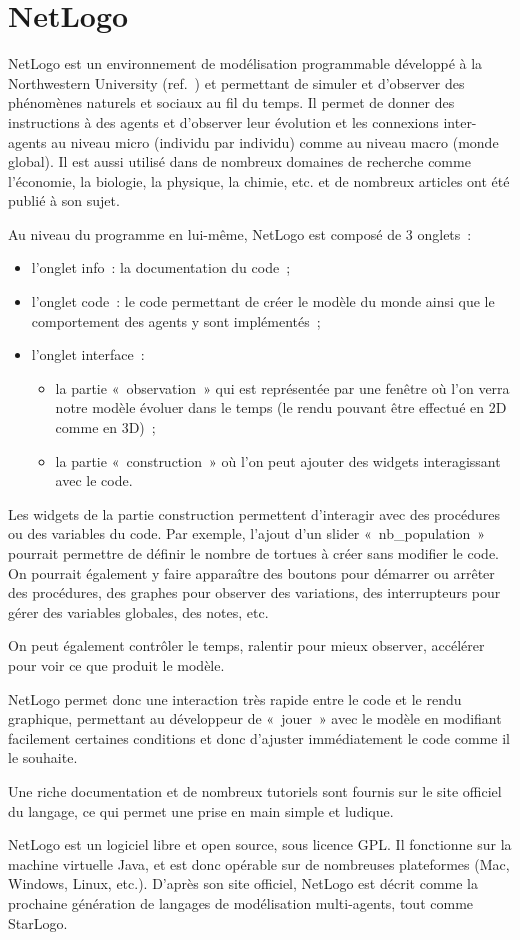\section{NetLogo}
\label{NetLogo}

NetLogo est un environnement de modélisation programmable développé à la Northwestern University (ref.~\cite{netlogo}) et permettant de simuler et d'observer des phénomènes naturels et sociaux au fil du temps. Il permet de donner des instructions à des agents et d'observer leur évolution et les connexions inter-agents au niveau micro (individu par individu) comme au niveau macro (monde global).
Il est aussi utilisé dans de nombreux domaines de recherche comme l'économie, la biologie, la physique, la chimie, etc. et de nombreux articles ont été publié à son sujet.

Au niveau du programme en lui-même, NetLogo est composé de 3 onglets~:
\begin{itemize}
	\item l'onglet info~: la documentation du code~;
	\item l'onglet code~: le code permettant de créer le modèle du monde ainsi que le comportement des agents y sont implémentés~;
	\item l'onglet interface~:
          \begin{itemize}
          \item la partie «~observation~» qui est représentée par une fenêtre où l'on verra notre modèle évoluer dans le temps (le rendu pouvant être effectué en 2D comme en 3D)~;
          \item la partie «~construction~» où l'on peut ajouter des widgets interagissant avec le code.
          \end{itemize}
\end{itemize}

Les widgets de la partie construction permettent d'interagir avec des procédures ou des variables du code. Par exemple, l'ajout d'un slider «~nb\_population~» pourrait permettre de définir le nombre de tortues à créer sans modifier le code. On pourrait également y faire apparaître des boutons pour démarrer ou arrêter des procédures, des graphes pour observer des variations, des interrupteurs pour gérer des variables globales, des notes, etc.

On peut également contrôler le temps, ralentir pour mieux observer, accélérer pour voir ce que produit le modèle.

NetLogo permet donc une interaction très rapide entre le code et le rendu graphique, permettant au développeur de «~jouer~» avec le modèle en modifiant facilement certaines conditions et donc d'ajuster immédiatement le code comme il le souhaite.

Une riche documentation et de nombreux tutoriels sont fournis sur le site officiel du langage, ce qui permet une prise en main simple et ludique.

NetLogo est un logiciel libre et open source, sous licence GPL. Il fonctionne sur la machine virtuelle Java, et est donc opérable sur de nombreuses plateformes (Mac, Windows, Linux, etc.).
D'après son site officiel, NetLogo est décrit comme la prochaine génération de langages de modélisation multi-agents, tout comme StarLogo.
